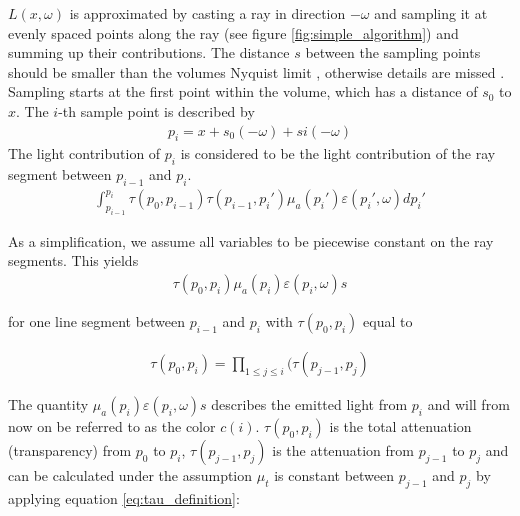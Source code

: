 $L({x},\omega )$ is approximated by casting a ray in direction $-\omega$ and sampling it at evenly spaced points along the ray (see figure \ref{fig:simple_algorithm}) and summing up their contributions\cite{511}. The distance $s$ between the sampling points should be smaller than the volumes Nyquist limit \cite{659497}, otherwise details are missed \cite{10.1145/2661229.2661292}.
Sampling starts at the first point within the volume, which has a distance of $s_0$ to ${x}$. The $i$-th sample point is described by
\begin{align*}
p_i={x} + s_0(-\omega) + si(-\omega)
\end{align*}
The light contribution of $p_i$ is considered to be the light contribution of the ray segment between $p_{i-1}$ and $p_i$.
\begin{align*}
\int_{p_{i-1}}^{p_i} \tau (p_0,p_{i-1}) \tau(p_{i-1},p_{i}') \mu_a(p_{i}')\varepsilon (p_{i}', \omega)dp_{i}'
\end{align*} 



As a simplification, we assume all variables to be piecewise constant\cite{10.1145/147130.147155} on the ray segments. This yields
\begin{align*}
\tau(p_0, p_i) \mu_a(p_{i})\varepsilon (p_{i}, \omega)s
\end{align*} 


for one line segment between $p_{i-1}$ and $p_i$ with $\tau(p_0, p_i)$ equal to


\begin{align*}
\tau(p_0, p_i)=\prod_{1\le j \le i}{(\tau(p_{j-1}, p_j)}
\end{align*} 



The quantity $\mu_a(p_{i})\varepsilon (p_{i}, \omega)s$ describes the emitted light from $p_i$ and will from now on be referred to as the color $c(i)$. $\tau(p_0, p_i)$ is the total attenuation (transparency) from $p_0$ to $p_i$, $\tau(p_{j-1}, p_j)$ is the attenuation from $p_{j-1}$ to $p_j$ and can be calculated under the assumption $\mu_t$ is constant between $p_{j-1}$ and $p_j$ by applying equation \ref{eq:tau_definition}: 



